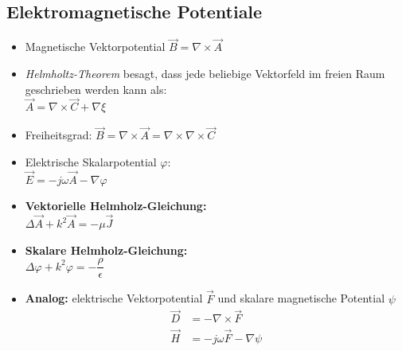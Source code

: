 {\subsection{Elektromagnetische Potentiale}
\begin{itemize}
    \itemsep1pt
    \item Magnetische Vektorpotential \(\vec{B} = \nabla\times\vec{A}\)
    \item \textit{Helmholtz-Theorem} besagt, dass jede beliebige Vektorfeld im freien Raum geschrieben werden kann als:\\
        \(\vec{A} = \nabla\times\vec{C} + \nabla\xi\)
    \item Freiheitsgrad: \(\vec{B} = \nabla\times\vec{A} = \nabla\times\nabla\times\vec{C}\)
    \item Elektrische Skalarpotential $\varphi$:\\
        \(\vec{E} = -j\omega\vec{A} - \nabla\varphi\)
    \item \textbf{Vektorielle Helmholz-Gleichung:}\\
        \(\Delta\vec{A} + k^2\vec{A}  = -\mu\vec{J}\)
    \item \textbf{Skalare Helmholz-Gleichung:}\\
        \(\Delta\varphi + k^2\varphi = -\dfrac{\rho}{\epsilon}\)
    \item \textbf{Analog:} elektrische Vektorpotential $\vec{F}$ und skalare magnetische Potential $\psi$
        \begin{align*}
            \vec{D} &= -\nabla \times \vec{F}\\
            \vec{H} &= -j\omega\vec{F} - \nabla\psi
        \end{align*}
\end{itemize}
}
